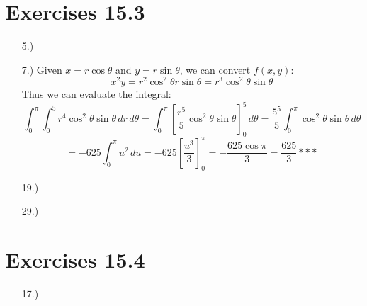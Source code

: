 \documentclass[12pt]{article}
\newcommand{\bracks}[1]{\left[#1\right]}
\begin{document}
\section*{Exercises 15.3}
\begin{itemize}
    \item [5.)] 

    \item [7.)] Given $x=r\cos\theta$ and $y=r\sin\theta$, we can convert $f(x,y)$:
    \[x^2y=r^2\cos^2\theta r\sin\theta=r^3\cos^2\theta\sin\theta\]
    Thus we can evaluate the integral:
    \[\int^\pi_0\int^5_0 r^4\cos^2\theta\sin\theta\,dr\,d\theta=\int^\pi_0\bracks{\frac{r^5}{5}\cos^2\theta\sin\theta}^5_0\,d\theta=\frac{5^5}{5}\int^\pi_0\cos^2\theta\sin\theta\,d\theta\]
    \[=-625\int^\pi_0u^2\,du=-625\bracks{\frac{u^3}{3}}^\pi_0=-\frac{625\cos\pi}{3}=\frac{625}{3}***\]

    \item [19.)] 

    \item [29.)]

\end{itemize}
\section*{Exercises 15.4}
\begin{itemize}
    \item [17.)]

\end{itemize}
\end{document}
